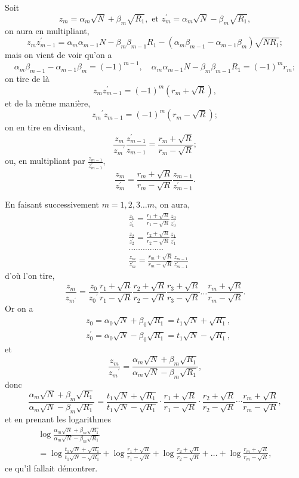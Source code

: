 \documentclass[oneside, 12 pt, leqno]{memoir}
\begin{document}
Soit
\[z_m=\alpha_m \sqrt{N}+\beta_m \sqrt{R_1}, \text { et } z_m^{\prime}=\alpha_m \sqrt{N}-\beta_m \sqrt{R_1},\]
on aura en multipliant,
\[z_m z_{m-1}^{\prime}=\alpha_m \alpha_{m-1} N-\beta_m \beta_{m-1} R_1-\left(\alpha_m \beta_{m-1}-\alpha_{m-1} \beta_m\right) \sqrt{N R_1};\]
mais on vient de voir qu'on a
\[\alpha_m \beta_{m-1}-\alpha_{m-1} \beta_m=(-1)^{m-1}, \quad \alpha_m \alpha_{m-1} N-\beta_m \beta_{m-1} R_1=(-1)^m r_m;\]
on tire de là
\[z_m z_{m-1}^{\prime}=(-1)^m\left(r_m+\sqrt{R}\right),\]
et de la même manière,
\[{z_m}^{\prime} z_{m-1}=(-1)^m\left(r_m-\sqrt{R}\right);\]
on en tire en divisant,
\[\frac{z_m}{{z_m}^{\prime}} \frac{z_{m-1}^{\prime}}{z_{m-1}}=\frac{r_m+\sqrt{R}}{r_m-\sqrt{R}};\]
ou, en multipliant par \(\frac{z_{m-1}}{z_{m-1}^{\prime}}\),
\[\frac{z_m}{z_m^{\prime}}=\frac{r_m+\sqrt{R}}{r_m-\sqrt{R}} \frac{z_{m-1}}{z_{m-1}^{\prime}}.\]

En faisant successivement \(m=1,2,3 \dots m\), on aura,
\[\begin{aligned}
&\frac{z_1}{z_1^{\prime}}=\frac{r_1+\sqrt{R}}{r_1-\sqrt{R}} \frac{z_0}{z_0^{\prime}} \\
&\frac{z_2}{z_2^{\prime}}=\frac{r_2+\sqrt{R}}{r_2-\sqrt{R}} \frac{z_1}{z_1^{\prime}} \\
&\dots \dots \dots \dots \dots \\
&\frac{z_m}{z_m^{\prime}}=\frac{r_m+\sqrt{R}}{r_m-\sqrt{R}} \frac{z_{m-1}}{z_{m-1}^{\prime}}
\end{aligned}\]
d'où l'on tire,
\[\frac{z_m}{z_{m^{\prime}}}=\frac{z_0}{z_0{ }^{\prime}} \frac{r_1+\sqrt{R}}{r_1-\sqrt{R}} \frac{r_2+\sqrt{R}}{r_2-\sqrt{R}} \frac{r_3+\sqrt{R}}{r_3-\sqrt{R}} \dots \frac{r_m+\sqrt{R}}{r_m-\sqrt{R}}.\]
Or on a
\[\begin{aligned}
& z_0=\alpha_0 \sqrt{N}+\beta_0 \sqrt{R_1}=t_1 \sqrt{N}+\sqrt{R_1}, \\
& z_0^{\prime}=\alpha_0 \sqrt{N}-\beta_0 \sqrt{R_1}=t_1 \sqrt{N}-\sqrt{R_1},
\end{aligned}\]
et
\[\frac{z_m}{{z_m}^{\prime}}=\frac{\alpha_m \sqrt{N}+\beta_m \sqrt{R_1}}{\alpha_m \sqrt{N}-\beta_m \sqrt{R_1}},\]
donc
\[\frac{\alpha_m \sqrt{N}+\beta_m \sqrt{R_1}}{\alpha_m \sqrt{N}-\beta_m \sqrt{R_1}}=\frac{t_1 \sqrt{N}+\sqrt{R_1}}{t_1 \sqrt{N}-\sqrt{R_1}} \cdot \frac{r_1+\sqrt{R}}{r_1-\sqrt{R}} \cdot \frac{r_2+\sqrt{R}}{r_2-\sqrt{R}} \cdots \frac{r_m+\sqrt{R}}{r_m-\sqrt{R}},\]
et en prenant les logarithmes
\begin{gather*}
\tag{26}\log \frac{\alpha_m \sqrt{N}+\beta_m \sqrt{R_1}}{\alpha_m \sqrt{N}-\beta_m \sqrt{R_1}} \\
=\log \frac{t_1 \sqrt{N}+\sqrt{R_1}}{t_1 \sqrt{N}-\sqrt{R_1}}+\log \frac{r_1+\sqrt{R}}{r_1-\sqrt{R}}+\log \frac{r_2+\sqrt{R}}{r_2-\sqrt{R}}+\dots+\log \frac{r_m+\sqrt{R}}{r_m-\sqrt{R}},
\end{gather*}
ce qu’il fallait démontrer.
\end{document}

